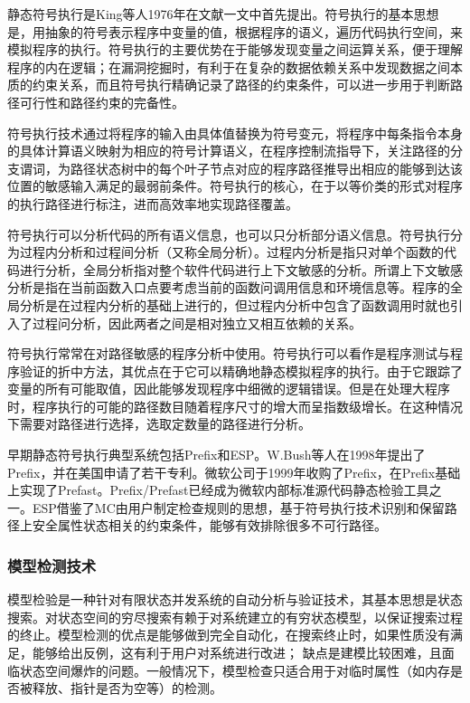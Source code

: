 静态符号执行是King等人1976年在文献一文中首先提出。符号执行的基本思想是，用抽象的符号表示程序中变量的值，根据程序的语义，遍历代码执行空间，来模拟程序的执行。符号执行的主要优势在于能够发现变量之间运算关系，便于理解程序的内在逻辑；在漏洞挖掘时，有利于在复杂的数据依赖关系中发现数据之间本质的约束关系，而且符号执行精确记录了路径的约束条件，可以进一步用于判断路径可行性和路径约束的完备性。

符号执行技术通过将程序的输入由具体值替换为符号变元，将程序中每条指令本身的具体计算语义映射为相应的符号计算语义，在程序控制流指导下，关注路径的分支谓词，为路径状态树中的每个叶子节点对应的程序路径推导出相应的能够到达该位置的敏感输入满足的最弱前条件。符号执行的核心，在于以等价类的形式对程序的执行路径进行标注，进而高效率地实现路径覆盖。

符号执行可以分析代码的所有语义信息，也可以只分析部分语义信息。符号执行分为过程内分析和过程间分析（又称全局分析）。过程内分析是指只对单个函数的代码进行分析，全局分析指对整个软件代码进行上下文敏感的分析。所谓上下文敏感分析是指在当前函数入口点要考虑当前的函数问调用信息和环境信息等。程序的全局分析是在过程内分析的基础上进行的，但过程内分析中包含了函数调用时就也引入了过程问分析，因此两者之间是相对独立又相互依赖的关系。

符号执行常常在对路径敏感的程序分析中使用。符号执行可以看作是程序测试与程序验证的折中方法，其优点在于它可以精确地静态模拟程序的执行。由于它跟踪了变量的所有可能取值，因此能够发现程序中细微的逻辑错误。但是在处理大程序时，程序执行的可能的路径数目随着程序尺寸的增大而呈指数级增长。在这种情况下需要对路径进行选择，选取定数量的路径进行分析。

早期静态符号执行典型系统包括Prefix和ESP。W.Bush等人在1998年提出了Prefix，并在美国申请了若干专利。微软公司于1999年收购了Prefix，在Prefix基础上实现了Prefast。Prefix/Prefast已经成为微软内部标准源代码静态检验工具之一。ESP借鉴了MC由用户制定检查规则的思想，基于符号执行技术识别和保留路径上安全属性状态相关的约束条件，能够有效排除很多不可行路径。

\subsubsection{模型检测技术}

模型检验是一种针对有限状态并发系统的自动分析与验证技术，其基本思想是状态搜索。对状态空间的穷尽搜索有赖于对系统建立的有穷状态模型，以保证搜索过程的终止。模型检测的优点是能够做到完全自动化，在搜索终止时，如果性质没有满足，能够给出反例，这有利于用户对系统进行改进； 缺点是建模比较困难，且面临状态空间爆炸的问题。一般情况下，模型检查只适合用于对临时属性（如内存是否被释放、指针是否为空等）的检测。

